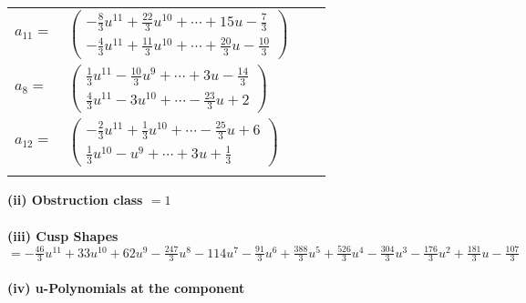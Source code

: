 \documentclass[1p]{elsarticle_modified}
\theoremstyle{definition}
\begin{document}
\begin{tabular}{m{7pt} m{180pt} m{7pt} m{180pt} }
\flushright $a_{11}=$&$\begin{pmatrix}-\frac{8}{3} u^{11}+\frac{22}{3} u^{10}+\cdots+15 u-\frac{7}{3}\\-\frac{4}{3} u^{11}+\frac{11}{3} u^{10}+\cdots+\frac{20}{3} u-\frac{10}{3}\end{pmatrix}$ \\
\flushright $a_{8}=$&$\begin{pmatrix}\frac{1}{3} u^{11}-\frac{10}{3} u^9+\cdots+3 u-\frac{14}{3}\\\frac{4}{3} u^{11}-3 u^{10}+\cdots-\frac{23}{3} u+2\end{pmatrix}$ \\
\flushright $a_{12}=$&$\begin{pmatrix}-\frac{2}{3} u^{11}+\frac{1}{3} u^{10}+\cdots-\frac{25}{3} u+6\\\frac{1}{3} u^{10}- u^9+\cdots+3 u+\frac{1}{3}\end{pmatrix}$\\&\end{tabular}
\flushleft \textbf{(ii) Obstruction class $= 1$}\\~\\
\flushleft \textbf{(iii) Cusp Shapes $= -\frac{46}{3} u^{11}+33 u^{10}+62 u^9-\frac{247}{3} u^8-114 u^7-\frac{91}{3} u^6+\frac{388}{3} u^5+\frac{526}{3} u^4-\frac{304}{3} u^3-\frac{176}{3} u^2+\frac{181}{3} u-\frac{107}{3}$}\\~\\
\newpage\renewcommand{\arraystretch}{1}
\flushleft \textbf{(iv) u-Polynomials at the component}\newline \\
\end{document}
